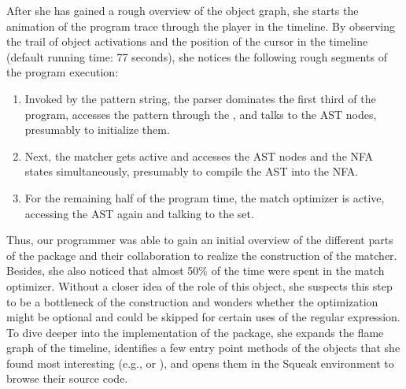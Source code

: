 After she has gained a rough overview of the object graph, she starts the animation of the program trace through the player in the timeline.
By observing the trail of object activations and the position of the cursor in the timeline (default running time: 77 seconds), she notices the following rough segments of the program execution:

\begin{enumerate}
	\item Invoked by the pattern string, the parser dominates the first third of the program, accesses the pattern through the , and talks to the AST nodes, presumably to initialize them.
	\item Next, the matcher gets active and accesses the AST nodes and the NFA states simultaneously, presumably to compile the AST into the NFA.
	\item For the remaining half of the program time, the match optimizer is active, accessing the AST again and talking to the set.
\end{enumerate}

Thus, our programmer was able to gain an initial overview of the different parts of the  package and their collaboration to realize the construction of the matcher.
Besides, she also noticed that almost 50\si{\percent} of the time were spent in the match optimizer.
Without a closer idea of the role of this object, she suspects this step to be a bottleneck of the construction and wonders whether the optimization might be optional and could be skipped for certain uses of the regular expression.
To dive deeper into the implementation of the  package, she expands the flame graph of the timeline, identifies a few entry point methods of the objects that she found most interesting (e.g.,  or ), and opens them in the Squeak environment to browse their source code.

